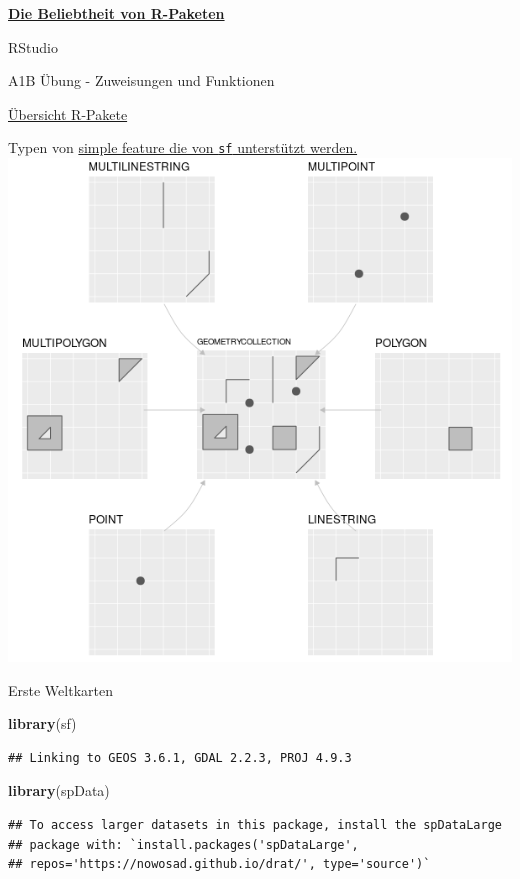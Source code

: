 \documentclass[ignorenonframetext,]{beamer}
\newenvironment{Shaded}{\begin{snugshade}}{\end{snugshade}}
\newcommand{\KeywordTok}[1]{\textcolor[rgb]{0.13,0.29,0.53}{\textbf{#1}}}
\newcommand{\NormalTok}[1]{#1}
\newcommand{\KeywordTok}[1]{\textcolor[rgb]{0.13,0.29,0.53}{\textbf{#1}}}
\newcommand{\NormalTok}[1]{#1}
\begin{document}
\begin{frame}{\href{https://gallery.shinyapps.io/cran-gauge/}{\textbf{Die
Beliebtheit von R-Paketen}}}
\begin{frame}{RStudio}
\begin{frame}[fragile]{A1B Übung - Zuweisungen und Funktionen}
\begin{frame}{\href{https://www.youtube.com/watch?v=kKI9--Opmso}{Übersicht
R-Pakete}}
\begin{frame}{Typen von
\href{https://geocompr.robinlovelace.net/spatial-class.html}{simple
feature die von \texttt{sf} unterstützt werden.}}
\includegraphics{figure/sf-classes.png}

\end{frame}

\begin{frame}[fragile]{Erste Weltkarten}

\begin{Shaded}
\begin{Highlighting}[]
\KeywordTok{library}\NormalTok{(sf)}
\end{Highlighting}
\end{Shaded}

\begin{verbatim}
## Linking to GEOS 3.6.1, GDAL 2.2.3, PROJ 4.9.3
\end{verbatim}

\begin{Shaded}
\begin{Highlighting}[]
\KeywordTok{library}\NormalTok{(spData) }
\end{Highlighting}
\end{Shaded}

\begin{verbatim}
## To access larger datasets in this package, install the spDataLarge
## package with: `install.packages('spDataLarge',
## repos='https://nowosad.github.io/drat/', type='source')`
\end{verbatim}


\end{frame}
\end{frame}
\end{frame}
\end{frame}
\end{frame}
\end{document}
